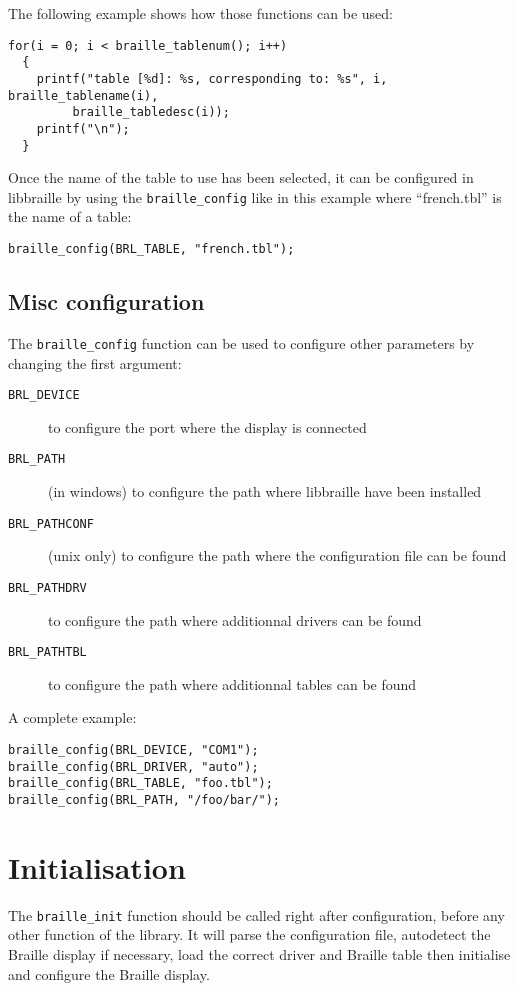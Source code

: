 \documentclass[12pt,a4paper]{article}
\begin{document}
The following example shows how those functions can be used:
\begin{verbatim}
for(i = 0; i < braille_tablenum(); i++)
  {
    printf("table [%d]: %s, corresponding to: %s", i, braille_tablename(i),
	     braille_tabledesc(i));
    printf("\n");
  }
\end{verbatim}

Once the name of the table to use has been selected, it can be
configured in libbraille by using the {\tt braille\_config} like in
this example where ``french.tbl'' is the name of a table:
\begin{verbatim}
braille_config(BRL_TABLE, "french.tbl");
\end{verbatim}

\subsection{Misc configuration}

The {\tt braille\_config} function can be used to configure other
parameters by changing the first argument:
\begin{description}
\item[{\tt BRL\_DEVICE}] to configure the port where the display is connected
\item[{\tt BRL\_PATH}] (in windows) to configure the path where
  libbraille have been installed
\item[{\tt BRL\_PATHCONF}] (unix only) to configure the path where
  the configuration file can be found
\item[{\tt BRL\_PATHDRV}] to configure the path where additionnal
  drivers can be found
\item[{\tt BRL\_PATHTBL}] to configure the path where additionnal
  tables can be found
\end{description}

A complete example:
\begin{verbatim}
braille_config(BRL_DEVICE, "COM1");
braille_config(BRL_DRIVER, "auto");
braille_config(BRL_TABLE, "foo.tbl");
braille_config(BRL_PATH, "/foo/bar/");
\end{verbatim}

\section{Initialisation}

The {\tt braille\_init} function should be called right after
configuration, before any other function of the library. It will parse
the configuration file, autodetect the Braille display if necessary,
load the correct driver and Braille table then initialise and
configure the Braille display.
\end{document}
